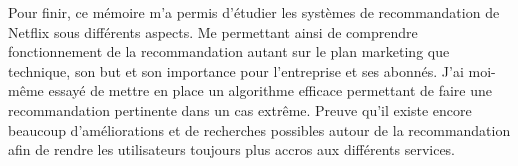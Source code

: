 \vspace{5mm}

Pour finir, ce mémoire m'a permis d’étudier les systèmes de recommandation de Netflix sous différents aspects. Me permettant ainsi de comprendre fonctionnement de la recommandation autant sur le plan marketing que technique, son but et son importance pour l'entreprise et ses abonnés. J'ai moi-même essayé de mettre en place un algorithme efficace permettant de faire une recommandation pertinente dans un cas extrême. Preuve qu'il existe encore beaucoup d'améliorations et de recherches possibles autour de la recommandation afin de rendre les utilisateurs toujours plus accros aux différents services. 
 
